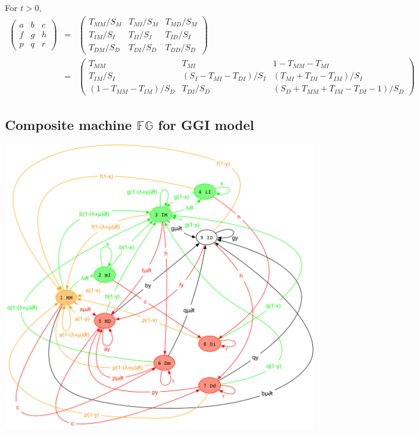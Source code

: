 \documentclass{article}
\begin{document}
For $t>0$, %
\begin{eqnarray*}
\begin{pmatrix}
a & b & c \\
f & g & h \\
p & q & r 
\end{pmatrix}
& = &
\begin{pmatrix}
T_{MM} / S_M & T_{MI} / S_M & T_{MD} / S_M \\
T_{IM} / S_I & T_{II} / S_I & T_{ID} / S_I \\
T_{DM} / S_D & T_{DI} / S_D & T_{DD} / S_D 
\end{pmatrix}
\\
& = &
\begin{pmatrix}
T_{MM} & T_{MI} & 1-T_{MM}-T_{MI} \\
T_{IM}/S_I & (S_I-T_{MI}-T_{DI})/S_I & (T_{MI}+T_{DI}-T_{IM})/S_I \\
(1-T_{MM}-T_{IM})/S_D & T_{DI}/S_D & (S_D+T_{MM}+T_{IM}-T_{DI}-1)/S_D 
\end{pmatrix}
\end{eqnarray*}

\subsection{Composite machine $\mathbb{FG}$ for GGI model}

\includegraphics[width=\textwidth]{PairInstant.pdf}
\end{document}
